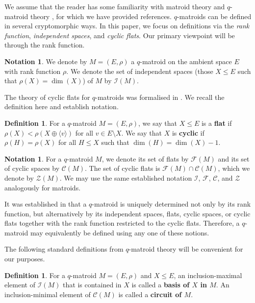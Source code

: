 \documentclass{article}
\theoremstyle{definition}
\newtheorem{definition}[theorem]{{{Definition}}}
\newtheorem{notation}[theorem]{{{Notation}}}
\begin{document}
We assume that the reader has some familiarity with matroid theory \cite{Welsh1976} and $q$-matroid theory \cite{JurriusPellikaan2018}, for which we have provided references. $q$-matroids can be defined in several cryptomorphic ways. In this paper, we focus on definitions via the \emph{rank function}, \emph{independent spaces}, and \emph{cyclic flats}. Our primary viewpoint will be through the rank function.

\begin{notation}
    We denote by $M=(E,\rho)$ a $q$-matroid on the ambient space $E$ with rank function $\rho$. We denote the set of independent spaces (those $X\leq E$ such that $\rho(X)=\dim(X)$) of $M$ by $\mathcal{I}(M)$.
\end{notation}

The theory of cyclic flats for $q$-matroids was formalised in \cite{AlfaranoByrne2024CyclicFlats}. We recall the definition here and establish notation.

\begin{definition}
    For a $q$-matroid $M=(E,\rho)$, we say that $X\leq E$ is a \textbf{flat} if $\rho(X)<\rho(X\oplus\langle v\rangle)$ for all $v\in E\setminus X$. We say that $X$ is \textbf{cyclic} if $\rho(H)=\rho(X)$ for all $H\leq X$ such that $\dim(H)=\dim(X)-1$.
\end{definition}

\begin{notation}
    For a $q$-matroid $M$, we denote its set of flats by $\mathcal{F}(M)$ and its set of cyclic spaces by $\mathcal{C}(M)$. The set of cyclic flats is $\mathcal{F}(M)\cap\mathcal{C}(M)$, which we denote by $\mathcal{Z}(M)$. We may use the same established notation $\mathcal{I}$, $\mathcal{F}$, $\mathcal{C}$, and $\mathcal{Z}$ analogously for matroids.
\end{notation}

It was established in \cite{JurriusPellikaan2018,AlfaranoByrne2024CyclicFlats} that a $q$-matroid is uniquely determined not only by its rank function, but alternatively by its independent spaces, flats, cyclic spaces, or cyclic flats together with the rank function restricted to the cyclic flats. Therefore, a $q$-matroid may equivalently be defined using any one of these notions.

The following standard definitions from $q$-matroid theory will be convenient for our purposes.

\begin{definition}
    For a $q$-matroid $M=(E,\rho)$ and $X\leq E$, an inclusion-maximal element of $\mathcal{I}(M)$ that is contained in $X$ is called a \textbf{basis of $X$ in $M$}. An inclusion-minimal element of $\mathcal{C}(M)$ is called a \textbf{circuit of $M$}.
\end{definition}
\end{document}
